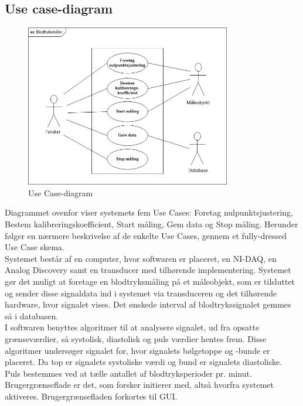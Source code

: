 \subsection{Use case-diagram}

\begin{figure}[H]
	\centering
	\includegraphics[width=0.8\textwidth]{Figurer/UseCasediagram}
	\caption{Use Case-diagram}
	\label{fig:Use Cases}
\end{figure}

Diagrammet ovenfor viser systemets fem Use Cases: Foretag nulpunktsjustering, Bestem kalibreringskoefficient, Start måling, Gem data og Stop måling. Herunder følger en nærmere beskrivelse af de enkelte Use Cases, gennem et fully-dressed Use Case skema. \\
\newline
Systemet består af en computer, hvor softwaren er placeret, en NI-DAQ, en Analog Discovery samt en transducer med tilhørende implementering. Systemet gør det muligt at foretage en blodtryksmåling på et måleobjekt, som er tilsluttet og sender disse signaldata ind i systemet via transduceren og det tilhørende hardware, hvor signalet vises. Det ønskede interval af blodtrykssignalet gemmes så i databasen. \\
I softwaren benyttes algoritmer til at analysere signalet, ud fra opsatte grænseværdier, så systolisk, diastolisk og puls værdier hentes frem. Disse algoritmer undersøger signalet for, hvor signalets bølgetoppe og -bunde er placeret. Da top er signalets systoliske værdi og bund er signalets diastoliske. Puls bestemmes ved at tælle antallet af blodtryksperioder pr. minut. \\    
Brugergrænseflade er det, som forsker initierer med, altså hvorfra systemet aktiveres. Brugergrænsefladen forkortes til GUI. 

